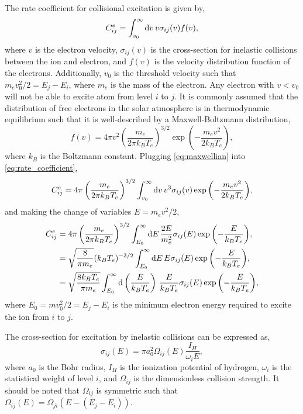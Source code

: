 The rate coefficient for collisional excitation is given by,
\begin{equation}\label{eq:rate_coefficient}
    C^e_{ij} = \int_{v_0}^{\infty}\textup{d}v\,v\sigma_{ij}(v)f(v),
\end{equation}
where $v$ is the electron velocity, $\sigma_{ij}(v)$ is the cross-section for inelastic collisions between the ion and electron, and $f(v)$ is the velocity distribution function of the electrons. Additionally, $v_0$ is the threshold velocity such that $m_ev_0^2/2 = E_j - E_i$, where $m_e$ is the mass of the electron. Any electron with $v<v_0$ will not be able to excite atom from level $i$ to $j$. It is commonly assumed that the distribution of free electrons in the solar atmosphere is in thermodynamic equilibrium such that it is well-described by a Maxwell-Boltzmann distribution,
\begin{equation}\label{eq:maxwellian}
    f(v) = 4\pi v^2 \left(\frac{m_e}{2\pi k_BT_e}\right)^{3/2}\exp{\left(-\frac{m_ev^2}{2k_BT_e}\right)},
\end{equation}
where $k_B$ is the Boltzmann constant. Plugging \autoref{eq:maxwellian} into \autoref{eq:rate_coefficient},
\begin{equation*}
    C^e_{ij} =  4\pi\left(\frac{m_e}{2\pi k_BT_e}\right)^{3/2}\int_{v_0}^{\infty}\textup{d}v\,v^3\sigma_{ij}(v)\exp{\left(-\frac{m_ev^2}{2k_BT_e}\right)},
\end{equation*}
and making the change of variables $E=m_ev^2/2$,
\begin{align}\label{eq:rate_coefficient_e}
    C^e_{ij} &= 4\pi\left(\frac{m_e}{2\pi k_BT_e}\right)^{3/2}\int_{E_0}^{\infty}\textup{d}E\,\frac{2E}{m_e^2}\sigma_{ij}(E)\exp{\left(-\frac{E}{k_BT_e}\right)},\nonumber\\
    &= \sqrt{\frac{8}{\pi m_e}}(k_BT_e)^{-3/2}\int_{E_0}^{\infty}\textup{d}E\,E\sigma_{ij}(E)\exp{\left(-\frac{E}{k_BT_e}\right)},\nonumber\\
    &= \sqrt{\frac{8k_BT_e}{\pi m_e}}\int_{E_0}^{\infty}\textup{d}\left(\frac{E}{k_BT_e}\right)\,\frac{E}{k_BT_e}\sigma_{ij}(E)\exp{\left(-\frac{E}{k_BT_e}\right)},
\end{align}
where $E_0=mv_0^2/2=E_j-E_i$ is the minimum electron energy required to excite the ion from $i$ to $j$.

The cross-section for excitation by inelastic collisions can be expressed as,
\begin{equation}\label{eq:cross_section}
    \sigma_{ij}(E) = \pi a_0^2 \Omega_{ij}(E)\frac{I_H}{\omega_iE},
\end{equation}
where $a_0$ is the Bohr radius, $I_H$ is the ionization potential of hydrogen, $\omega_i$ is the statistical weight of level $i$, and $\Omega_{ij}$ is the dimensionless collision strength. It should be noted that $\Omega_{ij}$ is symmetric such that $\Omega_{ij}(E)=\Omega_{ji}(E - (E_j - E_i))$.

